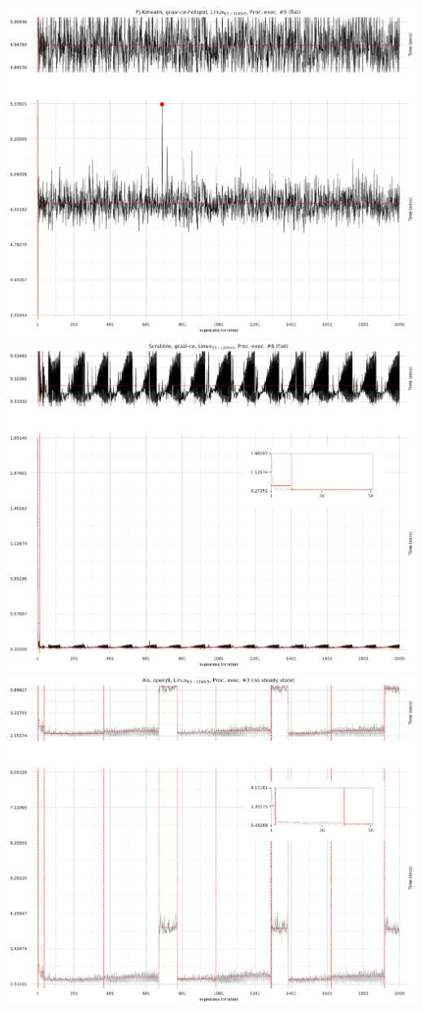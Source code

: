 \documentclass[a4paper]{article}
\begin{document}
\includegraphics[width=.45\textwidth]{plots/fastearly1.pdf}\\
\includegraphics[width=.45\textwidth]{plots/steps1.pdf}
\includegraphics[width=.45\textwidth]{plots/leak.pdf}
\end{document}
